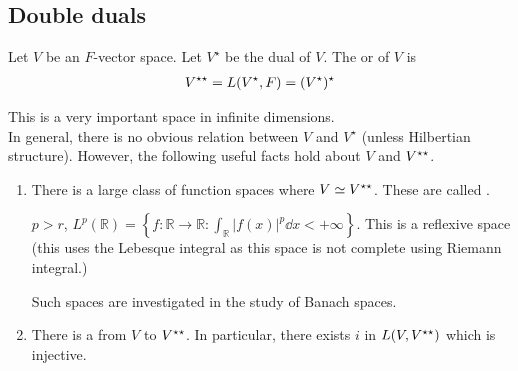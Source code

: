 \subsection{Double duals}
\begin{definition}
	Let $V$ be an $F$-vector space.
	Let $V^\star$ be the dual of $V$.
	The  or  of $V$ is
	\begin{align*}
		V^{\star\star} = L(V^\star, F) = (V^\star)^\star
	\end{align*}
\end{definition}
\begin{remark}
	This is a very important space in infinite dimensions. \\
	In general, there is no obvious relation between $V$ and $V^\star$ (unless Hilbertian structure).
	However, the following useful facts hold about $V$ and $V^{\star\star}$.
	\begin{enumerate}
		\item There is a large class of function spaces where $V \simeq V^{\star\star}$.
		These are called .
		\begin{example}
			$p > r$, $L^p(\mathbb{R}) = \left\{ f : \mathbb{R} \to \mathbb{R} : \int_{\mathbb{R}} |f(x)|^p \dd{x} < + \infty \right\}$.
			This is a reflexive space (this uses the Lebesque integral as this space is not complete using Riemann integral.)
		\end{example} 
		Such spaces are investigated in the study of Banach spaces.
		\item There is a  from $V$ to $V^{\star\star}$.
		In particular, there exists $i$ in $L(V, V^{\star\star})$ which is injective.
	\end{enumerate}
\end{remark}

